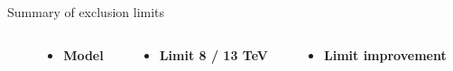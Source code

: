 \documentclass[8pt]{beamer}
\begin{document}
\begin{frame}{\large Summary of exclusion limits}


  \begin{columns}
  \begin{column}{3cm}
  \end{column}
  \begin{column}{3cm}
    \begin{itemize}
     \item[] \textbf{Model}
    \end{itemize}
  \end{column}
  \begin{column}{3.3cm}
    \begin{itemize}
     \item[] \textbf{Limit 8 / 13 TeV}
    \end{itemize}
  \end{column}
  \begin{column}{2.7cm}
    \begin{itemize}
     \item[] \textbf{Limit improvement}
    \end{itemize}
  \end{column}
 \end{columns}



\end{frame}
\end{document}
